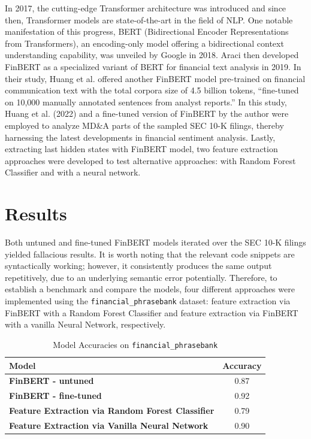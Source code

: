 \documentclass{article}
\begin{document}
\noindent In 2017, the cutting-edge Transformer architecture was introduced and since then, Transformer models are state-of-the-art in the field of NLP. One notable manifestation of this progress, BERT (Bidirectional Encoder Representations from Transformers), an encoding-only model offering a bidirectional context understanding capability, was unveiled by Google in 2018. \cite{devlin2018bert} Araci then developed FinBERT as a specialized variant of BERT for financial text analysis in 2019. \cite{araci2019finbert} In their study, Huang et al. offered another FinBERT model pre-trained on financial communication text with the total corpora size of 4.5 billion tokens, ``fine-tuned on 10,000 manually annotated sentences from analyst reports.'' \cite{huang2023finbert} In this study, Huang et al. (2022) and a fine-tuned version of FinBERT by the author were employed to analyze MD\&A parts of the sampled SEC 10-K filings, thereby harnessing the latest developments in financial sentiment analysis. Lastly, extracting last hidden states with FinBERT model, two feature extraction approaches were developed to test alternative approaches: with Random Forest Classifier and with a neural network.

\section{Results}

Both untuned and fine-tuned FinBERT models iterated over the SEC 10-K filings yielded fallacious results. It is worth noting that the relevant code snippets are syntactically working; however, it consistently produces the same output repetitively, due to an underlying semantic error potentially. Therefore, to establish a benchmark and compare the models, four different approaches were implemented using the \texttt{financial\_phrasebank} dataset: feature extraction via FinBERT with a Random Forest Classifier and feature extraction via FinBERT with a vanilla Neural Network, respectively.

\begin{table}[htbp]
    \centering
    \begin{tabular}{>{\bfseries}l c} %
        \toprule
        Model & \textbf{Accuracy} \\
        \midrule[\heavyrulewidth]
        FinBERT - untuned & 0.87 \\
        FinBERT - fine-tuned & 0.92 \\
        Feature Extraction via Random Forest Classifier & 0.79 \\
        Feature Extraction via Vanilla Neural Network & 0.90 \\
        \bottomrule
    \end{tabular}
    \caption{Model Accuracies on \texttt{financial\_phrasebank}}
\end{table}
\end{document}
